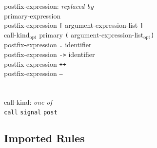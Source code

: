 \documentclass[11pt,letterpaper]{article}
\newcommand{\kw}[1]{{\tt #1}}
\newcommand{\opt}{$_{\mbox{opt}}$\xspace}
\begin{document}
\begin{tabbing}
postfix-expression: \emph{replaced by}\\
\>	primary-expression\\
\>	postfix-expression \kw{[} argument-expression-list \kw{]}\\
\>	call-kind\opt primary \kw{(} argument-expression-list\opt \kw{)}\\
\>	postfix-expression \kw{.} identifier\\
\>	postfix-expression \kw{->} identifier\\
\>	postfix-expression \kw{++}\\
\>	postfix-expression \kw{--}\\
\\\\
call-kind: \emph{one of}\\
\>	\kw{call} \kw{signal} \kw{post}
\end{tabbing} \rm

\subsection{Imported Rules}
\label{sec:imported}
\end{document}
